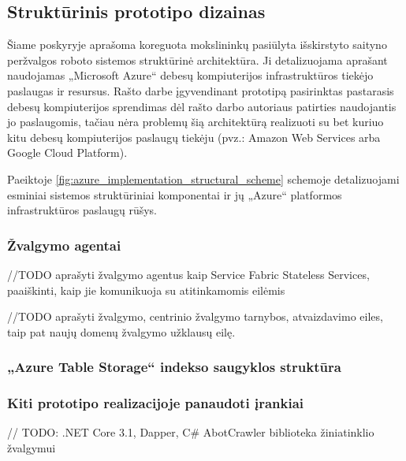 \subsection{Struktūrinis prototipo dizainas}

Šiame poskyryje aprašoma koreguota \cite{MercedCloudBasedWebCrawler} mokslininkų pasiūlyta išskirstyto saityno peržvalgos roboto sistemos struktūrinė architektūra. Ji detalizuojama aprašant naudojamas „Microsoft Azure“ debesų kompiuterijos infrastruktūros tiekėjo paslaugas ir resursus. Rašto darbe įgyvendinant prototipą pasirinktas pastarasis debesų kompiuterijos sprendimas dėl rašto darbo autoriaus patirties naudojantis jo paslaugomis, tačiau nėra problemų šią architektūrą realizuoti su bet kuriuo kitu debesų kompiuterijos paslaugų tiekėju (pvz.: Amazon Web Services arba Google Cloud Platform).


Paeiktoje \ref{fig:azure_implementation_structural_scheme} schemoje detalizuojami esminiai sistemos struktūriniai komponentai ir jų „Azure“ platformos infrastruktūros paslaugų rūšys.





\subsubsection{Žvalgymo agentai}

//TODO aprašyti žvalgymo agentus kaip Service Fabric Stateless Services, paaiškinti, kaip jie komunikuoja su atitinkamomis eilėmis


//TODO aprašyti žvalgymo, centrinio žvalgymo tarnybos, atvaizdavimo eiles, taip pat naujų domenų žvalgymo užklausų eilę.

\subsubsection{„Azure Table Storage“ indekso saugyklos struktūra}

\subsubsection{Kiti prototipo realizacijoje panaudoti įrankiai}

// TODO: .NET Core 3.1, Dapper, C\# AbotCrawler biblioteka žiniatinklio žvalgymui